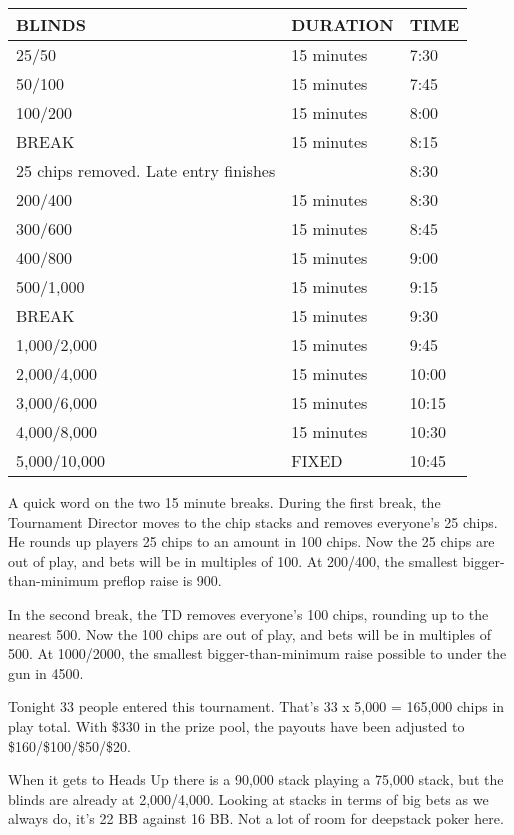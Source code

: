 \begin{tabular}{|l|l|l|} \hline
BLINDS  &  DURATION   & TIME \\ \hline
25/50   &  15 minutes & 7:30 \\ \hline
50/100  &  15 minutes & 7:45 \\ \hline
100/200 &  15 minutes & 8:00 \\ \hline
BREAK   &  15 minutes & 8:15 \\ \hline
25 chips removed. Late entry finishes &  & 8:30\\ \hline
200/400 &  15 minutes & 8:30 \\ \hline
300/600 &  15 minutes & 8:45 \\ \hline
400/800 &  15 minutes & 9:00 \\ \hline
500/1,000 & 15 minutes & 9:15 \\ \hline
BREAK   &  15 minutes  & 9:30 \\ \hline
1,000/2,000 & 15 minutes & 9:45 \\ \hline
2,000/4,000 & 15 minutes & 10:00 \\ \hline
3,000/6,000 & 15 minutes & 10:15 \\ \hline
4,000/8,000 & 15 minutes & 10:30 \\ \hline
5,000/10,000 & FIXED & 10:45 \\ \hline
\end{tabular}

A quick word on the two 15 minute breaks. During the first break,
the Tournament Director moves to the chip stacks and removes
everyone's 25 chips. He rounds up players 25 chips to an amount
in 100 chips. Now the 25 chips are out of play, and bets will be
in multiples of 100. At 200/400, the smallest bigger-than-minimum
preflop raise is 900.

In the second break, the TD removes everyone's 100 chips, rounding up
to the nearest 500. Now the 100 chips are out of play, and bets
will be in multiples of 500. At 1000/2000, the smallest
bigger-than-minimum raise possible to under the gun in 4500.

Tonight 33 people entered this tournament. That's 33 x 5,000 = 165,000
chips in play total. With \$330 in the prize pool, the payouts have been
adjusted to \$160/\$100/\$50/\$20.

When it gets to Heads Up there is a 90,000 stack
playing a 75,000 stack, but the blinds are already at 2,000/4,000.
Looking at stacks in terms of big bets as we always do,
it's 22 BB against 16 BB. Not a lot of room for deepstack
poker here.

